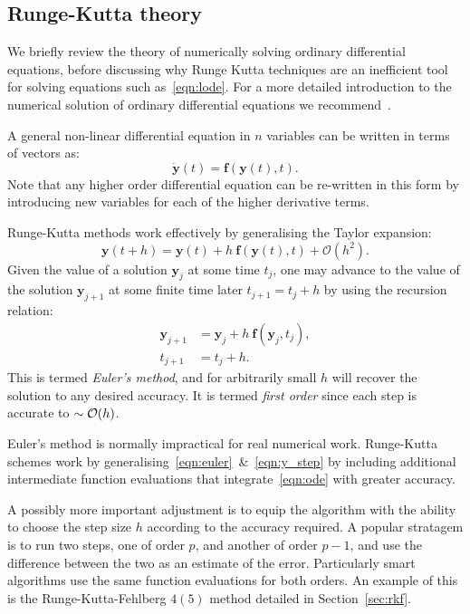 \subsection{Runge-Kutta theory}
\label{sec:rk}
We briefly review the theory of numerically solving ordinary differential equations, before discussing why Runge Kutta techniques are an inefficient tool for solving equations such as~\eqref{eqn:lode}.
For a more detailed introduction to the numerical solution of ordinary differential equations we recommend~\cite{Press+2007}.

A general non-linear differential equation in $n$ variables can be written in terms of vectors as:
\begin{equation}
  \dot{\mathbf{y}}(t) = \mathbf{f}(\mathbf{y}(t),t).
  \label{eqn:ode}
\end{equation}
Note that any higher order differential equation can be re-written in this form by introducing new variables for each of the higher derivative terms.

Runge-Kutta methods work effectively by generalising the Taylor expansion:
\begin{equation}
  \mathbf{y}(t+h)  = \mathbf{y}(t) + h\:\mathbf{f}(\mathbf{y}(t),t) + \mathcal{O}(h^2).
  \label{eqn:euler}
\end{equation}
Given the value of a solution $\mathbf{y}_j$ at some time $t_j$, one may advance to the value of the solution $\mathbf{y}_{j+1}$ at some finite time later $t_{j+1} = t_j + h$ by using the recursion relation:
\begin{align}
  \mathbf{y}_{j+1} &=  \mathbf{y}_{j} + h\:\mathbf{f}(\mathbf{y}_j,t_j),
  \label{eqn:y_step}\\
  t_{j+1} &=  t_{j} + h.
  \label{eqn:t_step}
\end{align}
This is termed {\em Euler's method}, and for arbitrarily small $h$ will recover the solution to any desired accuracy. It is termed {\em first order\/} since each step is accurate to ${\sim\mathcal{O}{\left(h\right)}}$.

Euler's method is normally impractical for real numerical work. Runge-Kutta schemes work by generalising~\eqref{eqn:euler}~\&~\eqref{eqn:y_step} by including additional intermediate function evaluations that integrate~\eqref{eqn:ode} with greater accuracy.

A possibly more important adjustment is to equip the algorithm with the ability to choose the step size $h$ according to the accuracy required. A popular stratagem is to run two steps, one of order $p$, and another of order $p-1$, and use the difference between the two as an estimate of the error. Particularly smart algorithms use the same function evaluations for both orders. An example of this is the Runge-Kutta-Fehlberg $4(5)$ method detailed in Section~\ref{sec:rkf}.

